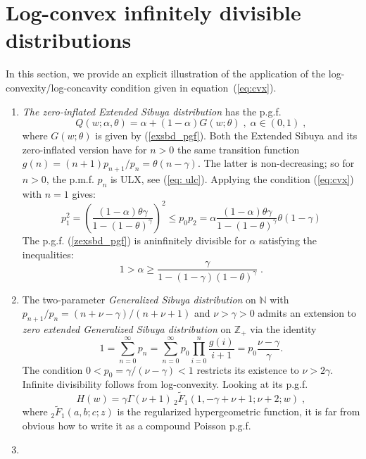 \documentclass[a4paper,12pt]{amsart}
\newcommand{\N}{\mathbb{N}}
\newcommand{\Z}{\mathbb{Z}_{+}}
\theoremstyle{definition}
\theoremstyle{remark}
\begin{document}
\section{Log-convex infinitely divisible distributions}\label{ExLX}
In this section, we provide an explicit illustration of the application of the log-convexity/log-concavity condition given in equation~(\ref{eq:cvx}).\begin{enumerate}[label=(\roman*), leftmargin=*]
\item 
\label{ex:zextSbd}
{\it The zero-inflated Extended Sibuya distribution} has the p.g.f. 
 \begin{equation}\label{zexsbd_pgf}
 Q(w;\alpha,\theta)=\alpha+(1-\alpha)G(w;\theta)\;,\; \alpha\in (0,1)\;,
 \end{equation}
where $G(w;\theta)$ is given by (\ref{exsbd_pgf}).
Both the Extended Sibuya and its zero-inflated version have for $n>0$ the same transition function 
$g(n)=(n+1)p_{n+1}/p_n=\theta(n-\gamma)$. The latter is non-decreasing; so for $n>0$, the p.m.f. $p_n$ is ULX, see (\ref{eq: ulc}). Applying the condition (\ref{eq:cvx}) with $n=1$ gives:
\[ p_1^2=\left(\frac{(1-\alpha)\theta\gamma}{1-(1-\theta)^{\gamma}}\right)^2
 \leq p_0 p_2 =\alpha  \frac{(1-\alpha)\theta\gamma}{1-(1-\theta)^{\gamma}}\theta(1-\gamma) \]
The p.g.f. (\ref{zexsbd_pgf}) is aninfinitely divisible for $\alpha$ satisfying the inequalities:
\begin{equation}
 1>\alpha\geq \frac{\gamma}{1-(1-\gamma)(1-\theta)^{\gamma}}\;.   
 \end{equation} 
\item \label{ex:zgSbd}
The two-parameter {\it Generalized Sibuya distribution} on $\N$ \cite{Kozu2017} with $p_{n+1}/p_n=(n+\nu-\gamma)/(n+\nu+1)$ and $\nu>\gamma>0$  admits an extension  to {\it zero extended Generalized Sibuya distribution} on $\Z $ via the identity
\[1=\sum_{n=0}^{\infty}p_n= \sum_{n=0}^{\infty}p_0\prod_{i=0}^n \frac{g(i)}{i+1}=p_0\frac{\nu-\gamma}{\gamma}.\] 
The condition $0<p_0=\gamma/(\nu-\gamma)<1$ restricts its existence to $\nu>2\gamma$. Infinite divisibility follows from log-convexity. Looking at its p.g.f.
\[H(w) =\gamma  \Gamma (\nu +1) \, _2\tilde{F}_1(1,-\gamma +\nu +1;\nu +2;w)\;,\]
where $_2\tilde{F}_1(a,b;c;z)$ is the regularized hypergeometric function, it is far from obvious how to write it as a compound Poisson p.g.f. 
\item \label{divPois}

\end{enumerate}
\end{document}
